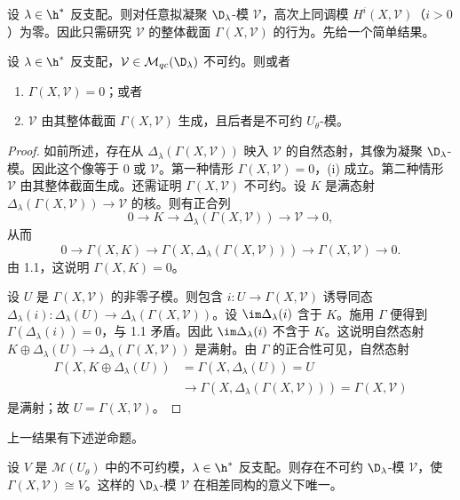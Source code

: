 设 $\lambda\in\h^*$ 反支配。则对任意拟凝聚 $\D_\lambda$-模 $\mathcal{V}$，高次上同调模 $H^i(X,\mathcal{V})$（$i>0$）为零。因此只需研究 $\mathcal{V}$ 的整体截面 $\Gamma(X,\mathcal{V})$ 的行为。先给一个简单结果。

\begin{proposition}\label{prop:03.5.1}
设 $\lambda\in\h^*$ 反支配，$\mathcal{V}\in\mathcal{M}_{qc}(\D_\lambda)$ 不可约。则或者
\begin{enumerate}[label=(\roman*)]
\item $\Gamma(X,\mathcal{V})=0$；或者
\item $\mathcal{V}$ 由其整体截面 $\Gamma(X,\mathcal{V})$ 生成，且后者是不可约 $U_\theta$-模。
\end{enumerate}
\end{proposition}

\begin{proof}
如前所述，存在从 $\Delta_\lambda(\Gamma(X,\mathcal{V}))$ 映入 $\mathcal{V}$ 的自然态射，其像为凝聚 $\D_\lambda$-模。因此这个像等于 $0$ 或 $\mathcal{V}$。第一种情形 $\Gamma(X,\mathcal{V})=0$，(i) 成立。第二种情形 $\mathcal{V}$ 由其整体截面生成。还需证明 $\Gamma(X,\mathcal{V})$ 不可约。设 $K$ 是满态射 $\Delta_\lambda(\Gamma(X,\mathcal{V}))\to\mathcal{V}$ 的核。则有正合列
$$0\longrightarrow K\longrightarrow\Delta_\lambda(\Gamma(X,\mathcal{V}))\longrightarrow\mathcal{V}\longrightarrow 0,$$
从而
$$0\longrightarrow\Gamma(X,K)\longrightarrow\Gamma(X,\Delta_\lambda(\Gamma(X,\mathcal{V})))\longrightarrow\Gamma(X,\mathcal{V})\longrightarrow 0.$$
由 1.1，这说明 $\Gamma(X,K)=0$。

设 $U$ 是 $\Gamma(X,\mathcal{V})$ 的非零子模。则包含 $i:U\to\Gamma(X,\mathcal{V})$ 诱导同态 $\Delta_\lambda(i):\Delta_\lambda(U)\to\Delta_\lambda(\Gamma(X,\mathcal{V}))$。设 $\im\Delta_\lambda(i)$ 含于 $K$。施用 $\Gamma$ 便得到 $\Gamma(\Delta_\lambda(i))=0$，与 1.1 矛盾。因此 $\im\Delta_\lambda(i)$ 不含于 $K$。这说明自然态射 $K\oplus\Delta_\lambda(U)\to\Delta_\lambda(\Gamma(X,\mathcal{V}))$ 是满射。由 $\Gamma$ 的正合性可见，自然态射
{\small
\begin{align*}
\Gamma(X,K\oplus\Delta_\lambda(U))&=\Gamma(X,\Delta_\lambda(U))=U\\
&\longrightarrow\Gamma(X,\Delta_\lambda(\Gamma(X,\mathcal{V})))=\Gamma(X,\mathcal{V})
\end{align*}}
是满射；故 $U=\Gamma(X,\mathcal{V})$。
\end{proof}

上一结果有下述逆命题。

\begin{proposition}\label{prop:03.5.2}
设 $V$ 是 $\mathcal{M}(U_\theta)$ 中的不可约模，$\lambda\in\h^*$ 反支配。则存在不可约 $\D_\lambda$-模 $\mathcal{V}$，使 $\Gamma(X,\mathcal{V})\cong V$。这样的 $\D_\lambda$-模 $\mathcal{V}$ 在相差同构的意义下唯一。
\end{proposition}

